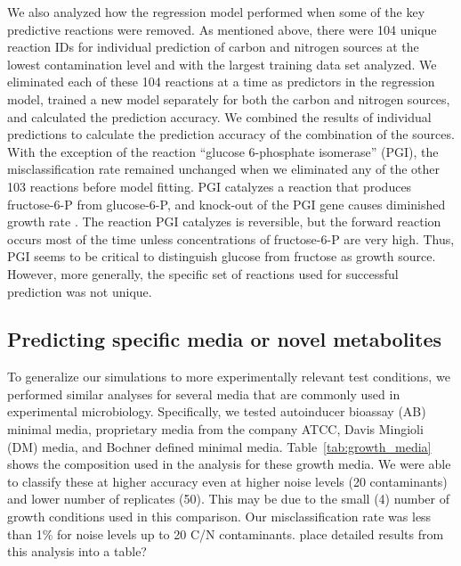 \documentclass[12pt]{article}
\begin{document}
We also analyzed how the regression model performed when some of the key predictive reactions were removed. As mentioned above, there were 104 unique reaction IDs for individual prediction of carbon and nitrogen sources at the lowest contamination level and with the largest training data set analyzed. We eliminated each of these 104 reactions at a time as predictors in the regression model, trained a new model separately for both the carbon and nitrogen sources, and calculated the prediction accuracy. We combined the results of individual predictions to calculate the prediction accuracy of the combination of the sources. With the exception of the reaction ``glucose 6-phosphate isomerase'' (PGI), the misclassification rate remained unchanged when we eliminated any of the other 103 reactions before model fitting. PGI catalyzes a reaction that produces fructose-6-P from glucose-6-P, and knock-out of the PGI gene causes diminished growth rate \cite{Canonacoetal2001}. The reaction PGI catalyzes is reversible, but the forward reaction occurs most of the time unless concentrations of fructose-6-P are very high. Thus, PGI seems to be critical to distinguish glucose from fructose as growth source. However, more generally, the specific set of reactions used for successful prediction was not unique.


\subsection*{Predicting specific media or novel metabolites}

To generalize our simulations to more experimentally relevant test conditions, we performed similar analyses for several media that are commonly used in experimental microbiology. Specifically, we tested autoinducer bioassay (AB) minimal media, proprietary media from the company ATCC, Davis Mingioli (DM) media, and Bochner defined minimal media. Table~\ref{tab:growth_media} shows the composition used in the analysis for these growth media. We were able to classify these at higher accuracy even at higher noise levels (20 contaminants) and lower number of replicates (50). This may be due to the small (4) number of growth conditions used in this comparison. Our misclassification rate was less than 1\% for noise levels up to 20 C/N contaminants. {\color{red}place detailed results from this analysis into a table?}
\end{document}
